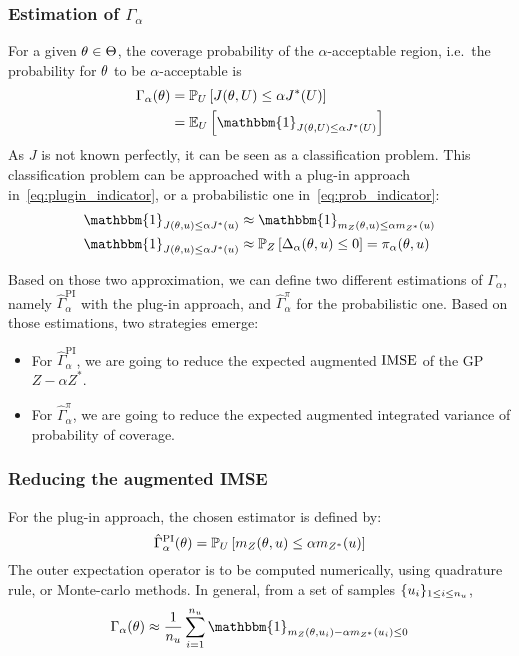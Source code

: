 \documentclass[../../Main_ManuscritThese.tex]{subfiles}
\begin{document}
\subsubsection{Estimation of $\Gamma_{\alpha}$}

For a given $\theta\in\Theta$, the coverage probability of the $\alpha$-acceptable region, i.e.\ the probability for $\theta$ to be $\alpha$-acceptable is
\begin{align}
  \Gamma_{\alpha}(\kk)                          & = \Prob_{U}\left[J(\kk,\UU) \leq \alpha J^*(\UU)\right]                                     \\
                                                & =\Ex_{U}\left[\mathbbm{1}_{J(\kk,\UU) \leq \alpha J^*(\UU)}\right]
\end{align}
As $J$ is not known perfectly, it can be seen as a classification
problem.  This classification problem can be approached with a plug-in
approach in~\cref{eq:plugin_indicator}, or a probabilistic one
in~\cref{eq:prob_indicator}:
\begin{align}
  \mathbbm{1}_{J(\kk,\uu) \leq \alpha J^*(\uu)} & \approx   \mathbbm{1}_{m_Z(\kk,\uu) \leq \alpha m_{{Z^*}}(\uu)} \label{eq:plugin_indicator} \\
  \mathbbm{1}_{J(\kk,\uu) \leq \alpha J^*(\uu)} & \approx   \Prob_{Z}\left[ \Delta_{\alpha}(\kk,\uu) \leq 0 \right] = \pi_{\alpha}(\kk,\uu) \label{eq:prob_indicator}
\end{align}

Based on those two approximation, we can define two different estimations of $\Gamma_\alpha$, namely $\hat{\Gamma}_\alpha^{\mathrm{PI}}$ with the plug-in approach, and $\hat{\Gamma}_{\alpha}^{\pi}$ for the probabilistic one. Based on those estimations, two strategies emerge:
\begin{itemize}
\item For $\hat{\Gamma}_{\alpha}^{\mathrm{PI}}$, we are going to reduce the expected augmented $\operatorname{\mathrm{IMSE}}$ of the GP $Z - \alpha Z^*$.
\item For $\hat{\Gamma}_{\alpha}^{\pi}$, we are going to reduce the expected augmented integrated variance of probability of coverage.
\end{itemize}

\subsubsection{Reducing the augmented IMSE}
For the plug-in approach, the chosen estimator is defined by:
  \begin{equation}
    \label{eq:def_gamma_PI}
    \hat{\Gamma}_{\alpha}^{\mathrm{PI}}(\theta) = \mathbb{P}_U\left[m_Z(\theta,u) \leq \alpha m_{{Z^*}}(u) \right]
  \end{equation}
  The outer expectation operator is to be computed numerically, using
  quadrature rule, or Monte-carlo methods. In general, from a set of
  samples $\{u_i\}_{1\leq i \leq n_{u}}$,
  \begin{equation}
    \Gamma_{\alpha}(\kk) \approx \frac{1}{n_{\uu}}\sum_{i=1}^{n_{\uu}} \mathbbm{1}_{m_Z(\kk, \uu_i) - \alpha m_{Z^*}(\uu_i)\leq 0}
  \end{equation}
\end{document}

